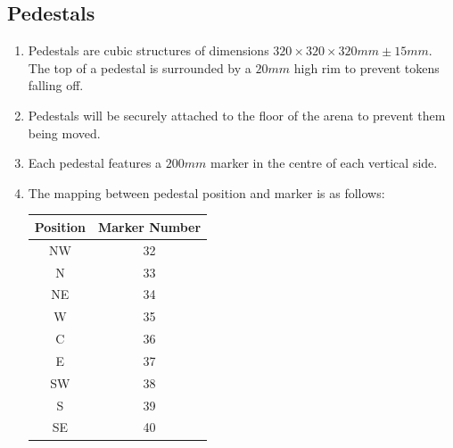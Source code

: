 \subsection{Pedestals}
\label{sub:pedestals}
\begin{enumerate}
\item Pedestals are cubic structures of dimensions $320 \times 320 \times 320mm \pm 15mm$.
      The top of a pedestal is surrounded by a $20mm$ high rim to prevent tokens falling off.

\item Pedestals will be securely attached to the floor of the arena to prevent them being moved.

\item Each pedestal features a $200mm$ marker in the centre of each vertical side.

\item The mapping between pedestal position and marker is as follows:

\begin{center}
  \begin{tabular}{cc}
    \toprule
    \textbf{Position} & \textbf{Marker Number} \\
    \midrule
    NW & 32 \\
    N  & 33 \\
    NE & 34 \\
    W  & 35 \\
    C  & 36 \\
    E  & 37 \\
    SW & 38 \\
    S  & 39 \\
    SE & 40 \\
    \bottomrule
  \end{tabular}
\end{center}

\end{enumerate}

